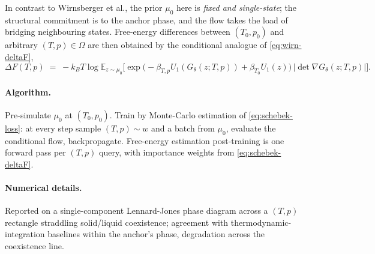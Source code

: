 \documentclass[11pt,letterpaper]{article}
\newcommand{\E}{\mathbb{E}}
\theoremstyle{plain}
\begin{document}
In contrast to Wirnsberger et al., the prior $\mu_0$ here is \emph{fixed
and single-state}; the structural commitment is to the anchor phase, and
the flow takes the load of bridging neighbouring states. Free-energy
differences between $(T_0,p_0)$ and arbitrary $(T,p)\in\Omega$ are then
obtained by the conditional analogue of \eqref{eq:wirn-deltaF},
\begin{equation}\label{eq:schebek-deltaF}
  \Delta F(T,p) \;=\; -k_B T\log\E_{z\sim\mu_0}\!\Big[\exp\!\big(-\beta_{T,p}U_1(G_\theta(z;T,p)) + \beta_{T_0}U_1(z)\big)\,\big|\det\nabla G_\theta(z;T,p)\big|\Big].
\end{equation}

\paragraph{Algorithm.} Pre-simulate $\mu_0$ at $(T_0,p_0)$. Train by
Monte-Carlo estimation of \eqref{eq:schebek-loss}: at every step sample
$(T,p)\sim w$ and a batch from $\mu_0$, evaluate the conditional flow,
backpropagate. Free-energy estimation post-training is one forward pass
per $(T,p)$ query, with importance weights from
\eqref{eq:schebek-deltaF}.

\paragraph{Numerical details.} Reported on a single-component
Lennard-Jones phase diagram across a $(T,p)$ rectangle straddling
solid/liquid coexistence; agreement with thermodynamic-integration
baselines within the anchor's phase, degradation across the coexistence
line.
\end{document}
